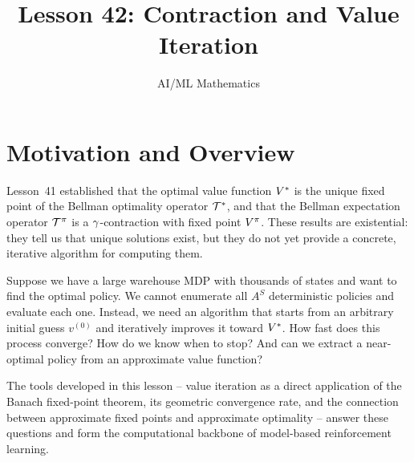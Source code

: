 \documentclass[11pt,a4paper]{article}
\title{Lesson 42: Contraction and Value Iteration}
\author{AI/ML Mathematics}
\date{}
\begin{document}
\maketitle
\tableofcontents
\newpage


\section{Motivation and Overview}
\label{sec:motivation}

Lesson~41 established that the optimal value function $V^*$ is the
unique fixed point of the Bellman optimality operator $\mathcal{T}^*$, and
that the Bellman expectation operator $\mathcal{T}^\pi$ is a
$\gamma$-contraction with fixed point $V^{\pi}$. These results are
existential: they tell us that unique solutions exist, but they do not
yet provide a concrete, iterative algorithm for computing them.

Suppose we have a large warehouse MDP with thousands of states and
want to find the optimal policy. We cannot enumerate all $A^S$
deterministic policies and evaluate each one. Instead, we need an
algorithm that starts from an arbitrary initial guess $v^{(0)}$ and
iteratively improves it toward $V^*$. How fast does this process
converge? How do we know when to stop? And can we extract a
near-optimal policy from an approximate value function?

The tools developed in this lesson -- value iteration as a direct
application of the Banach fixed-point theorem, its geometric
convergence rate, and the connection between approximate fixed points
and approximate optimality -- answer these questions and form the
computational backbone of model-based reinforcement learning.
\end{document}
